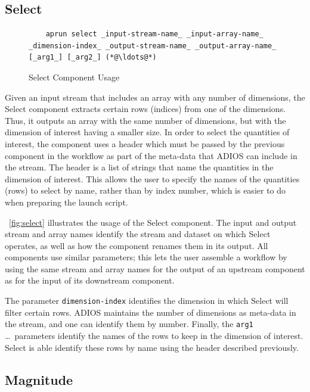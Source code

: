 \subsection{Select}

\begin{figure}
  \begin{lstlisting}
    aprun select _input-stream-name_ _input-array-name_ _dimension-index_ _output-stream-name_ _output-array-name_ [_arg1_] [_arg2_] (*@\ldots@*)
  \end{lstlisting}
  \vspace{-0.05in}
  \caption{Select Component Usage}
  \label{fig:select}
  \vspace{-0.05in}
\end{figure}

Given an input stream that includes an array with
any number of dimensions,
the Select component extracts certain rows (indices) from one of
the dimensions.
Thus, it outputs an array
with the same number of dimensions,
but with the dimension of interest having a
smaller size. In order to select the quantities of
interest, the component uses a header which
must be passed by the previous component in the
workflow as part of the meta-data that ADIOS
can include in the stream.
The header is a list of strings that
name the quantities in the
dimension of interest.
This allows the user to specify
the names of the quantities (rows)
to select by name, rather than by index number,
which is easier to do when preparing the launch script.

~\autoref{fig:select} illustrates the usage
of the Select component. 
The input and output stream and array names
identify the stream and dataset on
which Select operates, as well as how
the component renames them in its output.
All components use similar parameters; this lets
the user assemble a workflow by
using the same stream and array names
for the output of an upstream component
as for the input of its downstream component.

The parameter \texttt{dimension-index} identifies
the dimension in which Select will filter
certain rows. ADIOS maintains the number of dimensions
as meta-data in the stream, and one can identify them
by number. Finally, the \texttt{arg1} \ldots \ parameters 
identify the names of the rows to keep in the dimension
of interest. Select is able identify these rows
by name using the header described previously.

\subsection{Magnitude}

